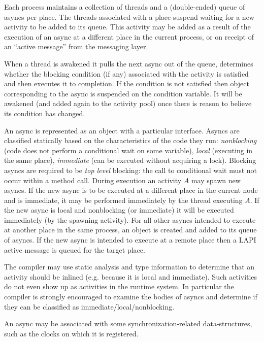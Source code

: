 Each process maintains a collection of threads and a (double-ended)
queue of asyncs per place. The threads associated with a place suspend
waiting for a new activity to be added to its queue. This activity may
be added as a result of the execution of an async at a different place
in the current process, or on receipt of an ``active message'' from
the messaging layer.

When a thread is awakened it pulls the next async out of the queue,
determines whether the blocking condition (if any) associated with the
activity is satisfied and then executes it to completion. If the
condition is not satisfied then object corresponding to the async is
suspended on the condition variable. It will be awakened (and added
again to the activity pool) once there is reason to believe its
condition has changed.

An async is represented as an object with a particular interface.
Asyncs are classified statically based on the characteristics of the
code they run: {\em nonblocking} (code does not perform a conditional
wait on some variable), {\em local} (executing in the same place),
{\em immediate} (can be executed without acquiring a lock). Blocking
asyncs are required to be {\em top level} blocking: the call to
conditional wait must not occur within a method call. During execution
an activity $A$ may spawn new asyncs. If the new async is to be
executed at a different place in the current node and is immediate, it
may be performed immediately by the thread executing $A$.  If the new
async is local and nonblocking (or immediate) it will be executed
immediately (by the spawning activity).  For all other asyncs intended
to execute at another place in the same process, an object is created
and added to its queue of asyncs. If the new async is intended to
execute at a remote place then a LAPI active message is queued for the
target place. 

The compiler may use static analysis and type information to
determine that an activity should be inlined (e.g.{} because it is
local and immediate). Such activities do not even show up as
activities in the runtime system. In particular the compiler is
strongly encouraged to examine the bodies of asyncs and determine if
they can be classified as immediate/local/nonblocking.

An async may be associated with some synchronization-related
data-structures, such as the clocks on which it is registered.

